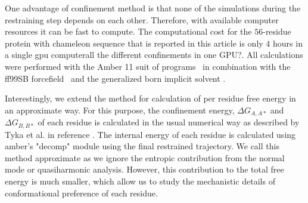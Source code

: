 \documentclass[12pt]{article}
\newcommand{\Alberto}[1]{\color{ForestGreen}#1\normalcolor }
\begin{document}
One advantage of confinement method is that
none of the simulations during the restraining step depends on each other. Therefore, with available computer resources it can be fast 
to compute. The computational cost for the $56$-residue protein with chameleon sequence that is reported in this article is only $4$ hours 
in a single gpu computer\Alberto{all the different confinements in one GPU?}. All calculations were
performed with the Amber 11 suit of programs~\cite{Case2012,Goetz2012} in combination with the ff99SB
forcefield~\cite{Hornak2006} and the generalized born implicit solvent \cite{Mongan2006}. 

Interestingly, we extend the
method for calculation of per residue free energy in an approximate way. For this purpose, the confinement energy,
$\Delta G_{A,A*}$ and $\Delta G_{B,B*}$ of each residue is calculated in the usual numerical way as described by
Tyka et al. in reference \cite{Tyka2006}. The internal energy of each residue is calculated using
amber's "decomp" module using the
final restrained trajectory. We call this method approximate as we ignore the entropic contribution from the normal mode
or quasiharmonic analysis. However, this contribution to the total free energy is much smaller, which allow us to study
the mechanistic details of conformational preference of each residue.  
\end{document}

